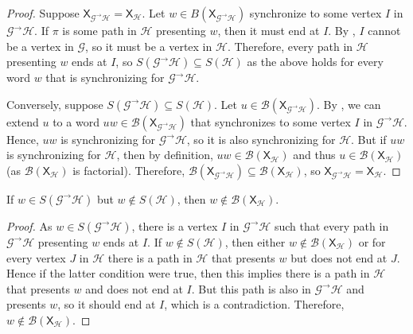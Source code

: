\documentclass[hidelinks]{report}
\newcommand{\Gc}{\mathcal{G}}  %
\newcommand{\Hc}{\mathcal{H}}  %
\newcommand{\Bc}{\mathcal{B}}
\newcommand{\GtH}{{\Gc^\to\Hc}}
\newcommand{\shift}[1]{\mathsf{X}_{#1}}
\theoremstyle{definition}
\begin{document}
\begin{proof}
    Suppose \(\shift{\GtH} = \shift{\Hc}\). Let \(w \in B(\shift{\GtH})\) synchronize to some vertex \(I\)
    in \(\GtH\).
    If \(\pi\) is some path in \(\Hc\) presenting \(w\), then it must end at \(I\). By 
    , \(I\) cannot be a vertex in \(\Gc\), so it must be a vertex in \(\Hc\).
    Therefore, every path in \(\Hc\) presenting \(w\) ends at \(I\), so \(S(\GtH) \subseteq S(\Hc)\)
    as the above holds for every word \(w\) that is synchronizing for \(\GtH\).

    Conversely, suppose \(S(\GtH) \subseteq S(\Hc)\). Let \(u \in \Bc(\shift{\GtH})\).
    By , we can extend \(u\) to a word \(uw \in \Bc(\shift{\GtH})\) that 
    synchronizes to some vertex \(I\) in \(\GtH\). Hence, \(uw\) is synchronizing 
    for \(\GtH\), so it is also synchronizing for \(\Hc\). But if \(uw\) is synchronizing for
    \(\Hc\), then by definition, \(uw \in \Bc(\shift{\Hc})\) and thus \(u \in \Bc(\shift{\Hc})\)
    (as \(\Bc(\shift{\Hc})\) is factorial). Therefore, \(\Bc(\shift{\GtH}) \subseteq \Bc(\shift{\Hc})\),
    so \(\shift{\GtH} = \shift{\Hc}\).
\end{proof}

\begin{proposition}
    If \(w \in S(\GtH)\) but \(w \notin S(\Hc)\), then \(w \notin \Bc(\shift{\Hc})\). 
\end{proposition}

\begin{proof}
    As \(w \in S(\GtH)\), there is a vertex \(I\) in \(\GtH\) such that every path in 
    \(\GtH\) presenting \(w\) ends at \(I\).
    If \(w \notin S(\Hc)\), then either 
    \(w \notin \Bc(\shift{\Hc})\) or for every vertex \(J\) in \(\Hc\) there is a path
    in \(\Hc\) that presents \(w\) but does not end at \(J\). Hence if the latter 
    condition were true, then this implies there is a path in \(\Hc\) that presents \(w\) 
    and does not end at \(I\). But this path is also in \(\GtH\) and presents \(w\), so it 
    should end at \(I\), which is a contradiction. Therefore, \(w \notin \Bc(\shift{\Hc})\).
\end{proof}

\end{document}
